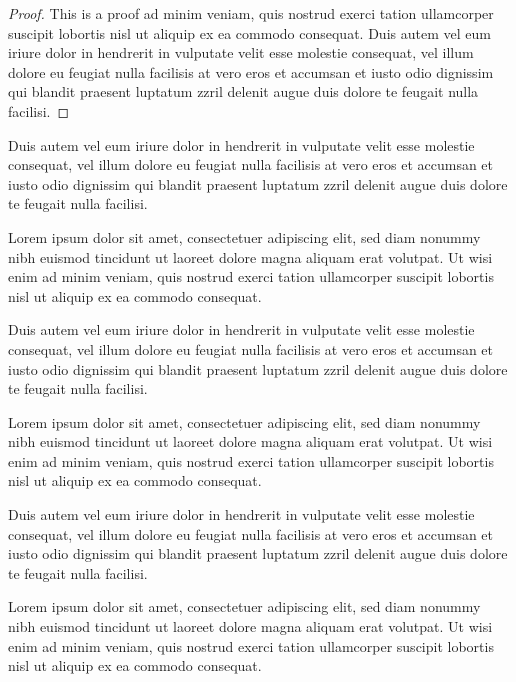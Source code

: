 \documentclass[oldfontcommands,6x9]{pupbook}
\begin{document}
\begin{proof}
This is a proof ad minim veniam, quis nostrud exerci tation ullamcorper
suscipit lobortis nisl ut aliquip ex ea commodo consequat. Duis autem
vel eum iriure dolor in hendrerit in vulputate velit esse molestie
consequat, vel illum dolore eu feugiat nulla facilisis at vero eros et
accumsan et iusto odio dignissim qui blandit praesent luptatum zzril
delenit augue duis dolore te feugait nulla facilisi. 
\end{proof}

Duis autem vel eum iriure dolor in hendrerit in vulputate velit esse
molestie consequat, vel illum dolore eu feugiat nulla facilisis at vero
eros et accumsan et iusto odio dignissim qui blandit praesent luptatum
zzril delenit augue duis dolore te feugait nulla facilisi. 

\begin{definition}
Lorem ipsum
dolor sit amet, consectetuer adipiscing elit, sed diam nonummy nibh
euismod tincidunt ut laoreet dolore magna aliquam erat volutpat. Ut wisi
enim ad minim veniam, quis nostrud exerci tation ullamcorper suscipit
lobortis nisl ut aliquip ex ea commodo consequat. 
\end{definition}


Duis autem vel eum iriure dolor in hendrerit in vulputate velit esse
molestie consequat, vel illum dolore eu feugiat nulla facilisis at vero
eros et accumsan et iusto odio dignissim qui blandit praesent luptatum
zzril delenit augue duis dolore te feugait nulla facilisi. 

\begin{lemma}
Lorem ipsum
dolor sit amet, consectetuer adipiscing elit, sed diam nonummy nibh
euismod tincidunt ut laoreet dolore magna aliquam erat volutpat. Ut wisi
enim ad minim veniam, quis nostrud exerci tation ullamcorper suscipit
lobortis nisl ut aliquip ex ea commodo consequat. 
\end{lemma}


Duis autem vel eum iriure dolor in hendrerit in vulputate velit esse
molestie consequat, vel illum dolore eu feugiat nulla facilisis at vero
eros et accumsan et iusto odio dignissim qui blandit praesent luptatum
zzril delenit augue duis dolore te feugait nulla facilisi. 

\begin{conjecture}
Lorem ipsum
dolor sit amet, consectetuer adipiscing elit, sed diam nonummy nibh
euismod tincidunt ut laoreet dolore magna aliquam erat volutpat. Ut wisi
enim ad minim veniam, quis nostrud exerci tation ullamcorper suscipit
lobortis nisl ut aliquip ex ea commodo consequat. 
\end{conjecture}
\end{document}
